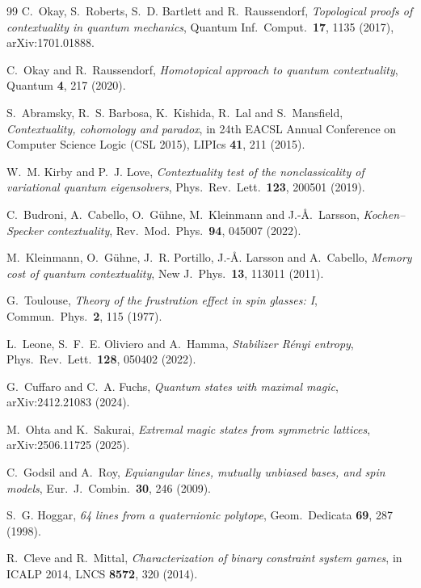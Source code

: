 \documentclass[a4paper,onecolumn,11pt,unpublished,nopdfoutputerror]{quantumarticle}
\theoremstyle{definition}
\begin{document}
\begin{thebibliography}{99}
 C.~Okay, S.~Roberts, S.~D. Bartlett and R.~Raussendorf,
\emph{Topological proofs of contextuality in quantum mechanics}, Quantum Inf.\ Comput.\ \textbf{17}, 1135 (2017),
arXiv:1701.01888.

 C.~Okay and R.~Raussendorf, \emph{Homotopical approach to quantum contextuality},
Quantum \textbf{4}, 217 (2020).

 S.~Abramsky, R.~S. Barbosa, K.~Kishida, R.~Lal and S.~Mansfield, \emph{Contextuality,
cohomology and paradox}, in 24th EACSL Annual Conference on Computer Science Logic (CSL 2015), LIPIcs \textbf{41},
211 (2015).

 W.~M. Kirby and P.~J. Love, \emph{Contextuality test of the nonclassicality of variational
quantum eigensolvers}, Phys.\ Rev.\ Lett.\ \textbf{123}, 200501 (2019).

 C.~Budroni, A.~Cabello, O.~G\"uhne, M.~Kleinmann and J.-{\AA}.~Larsson, \emph{Kochen--Specker
contextuality}, Rev.\ Mod.\ Phys.\ \textbf{94}, 045007 (2022).

 M.~Kleinmann, O.~G\"uhne, J.~R. Portillo, J.-{\AA}. Larsson and A.~Cabello, \emph{Memory cost of
quantum contextuality}, New J.\ Phys.\ \textbf{13}, 113011 (2011).

 G.~Toulouse, \emph{Theory of the frustration effect in spin glasses: I}, Commun.\ Phys.\
\textbf{2}, 115 (1977).

 L.~Leone, S.~F.~E. Oliviero and A.~Hamma, \emph{Stabilizer R\'enyi entropy},
Phys.\ Rev.\ Lett.\ \textbf{128}, 050402 (2022).

 G.~Cuffaro and C.~A. Fuchs, \emph{Quantum states with maximal magic}, arXiv:2412.21083
(2024).

 M.~Ohta and K.~Sakurai, \emph{Extremal magic states from symmetric lattices},
arXiv:2506.11725 (2025).

 C.~Godsil and A.~Roy, \emph{Equiangular lines, mutually unbiased bases, and spin models},
Eur.\ J.\ Combin.\ \textbf{30}, 246 (2009).

 S.~G. Hoggar, \emph{64 lines from a quaternionic polytope}, Geom.\ Dedicata \textbf{69}, 287
(1998).

 R.~Cleve and R.~Mittal, \emph{Characterization of binary constraint system games}, in
ICALP 2014, LNCS \textbf{8572}, 320 (2014).


\end{thebibliography}
\end{document}
